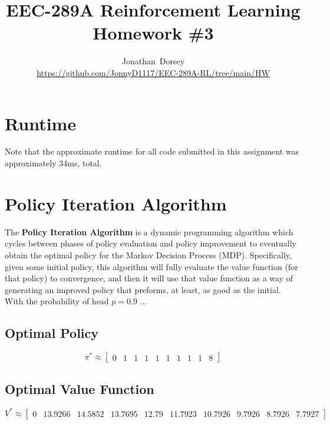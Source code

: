 \documentclass[12pt]{article}
\begin{document}
\title{ EEC-289A Reinforcement Learning \\ Homework \#3 }


\author{Jonathan~Dorsey \\\url{https://github.com/JonnyD1117/EEC-289A-RL/tree/main/HW}}
\maketitle

\section*{Runtime}

Note that the approximate runtime for all code submitted in this assignment was approximately 34ms, total.

\section*{Policy Iteration Algorithm }

The \textbf{Policy Iteration Algorithm} is a dynamic programming algorithm which cycles between phases of policy evaluation and policy improvement to eventually obtain the optimal policy for the Markov Decision Process (MDP). Specifically, given some initial policy, this algorithm will fully evaluate the value function (for that policy) to convergence, and then it will use that value function as a way of generating an improved policy that preforms, at least, as good as the initial. \\

With the probability of head $p = 0.9$ ...

\subsection*{Optimal Policy }

$$
\pi^{*} \approx \begin{bmatrix}
    0 & 1 & 1 & 1 & 1 & 1 & 1 & 1 & 1 & 8
\end{bmatrix}
$$

\subsection*{Optimal Value Function}

$$
V^{*} \approx \begin{bmatrix}
    0 & 13.9266 & 14.5852 & 13.7695 & 12.79 & 11.7923 & 10.7926 & 9.7926 & 8.7926 & 7.7927
\end{bmatrix}
$$
\end{document}
